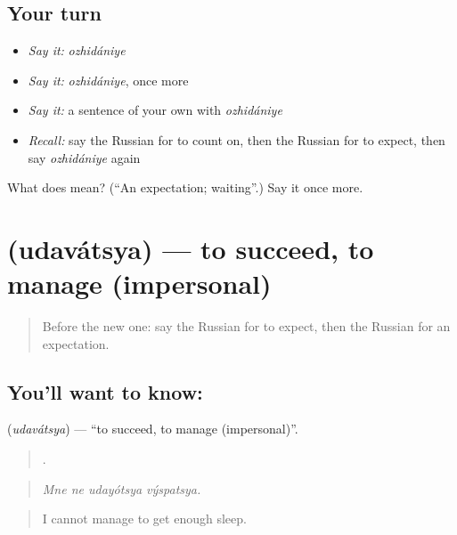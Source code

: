 \subsection*{Your turn}
\begin{itemize}
\raggedright
  \item \emph{Say it:} \emph{ozhidániye}
  \item \emph{Say it:} \emph{ozhidániye}, once more
  \item \emph{Say it:} a sentence of your own with \emph{ozhidániye}
  \item \emph{Recall:} say the Russian for to count on, then the Russian for to expect, then say \emph{ozhidániye} again
\end{itemize}

\begin{tcolorbox}[breakable,colback=teal!4,colframe=teal!35!black,title={Before you move on}]
What does  mean? (\textquotedblleft{}An expectation; waiting\textquotedblright{}.) Say it once more.
\end{tcolorbox}
\section[\texorpdfstring{\ru{удаваться} (udavátsya)}{удаваться (udavátsya)}]{ (udavátsya) — to succeed, to manage (impersonal)}

\label{lesson:RU-C374-udavatsya}



\begin{quote}
Before the new one: say the Russian for to expect, then the Russian for an expectation.
\end{quote}

\subsection*{You'll want to know: }
\textbf{} (\emph{udavátsya}) — \textquotedblleft{}to succeed, to manage (impersonal)\textquotedblright{}.

\begin{quote}
   .
\end{quote}

\begin{quote}
\emph{Mne ne udayótsya výspatsya.}
\end{quote}

\begin{quote}
I cannot manage to get enough sleep.
\end{quote}

